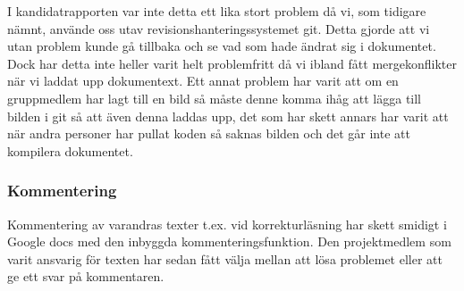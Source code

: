 
I kandidatrapporten var inte detta ett lika stort problem då vi, som tidigare nämnt, använde oss utav revisionshanteringssystemet git. Detta gjorde att vi utan problem kunde gå tillbaka och se vad som hade ändrat sig i dokumentet. Dock har detta inte heller varit helt problemfritt då vi ibland fått mergekonflikter när vi laddat upp dokumentext. Ett annat problem har varit att om en gruppmedlem har lagt till en bild så måste denne komma ihåg att lägga till bilden i git så att även denna laddas upp, det som har skett annars har varit att när andra personer har pullat koden så saknas bilden och det går inte att kompilera dokumentet.



\subsubsection{Kommentering}
Kommentering av varandras texter t.ex. vid korrekturläsning har skett smidigt i Google docs med den inbyggda kommenteringsfunktion. Den projektmedlem som varit ansvarig för texten har sedan fått välja mellan att lösa problemet eller att ge ett svar på kommentaren.

